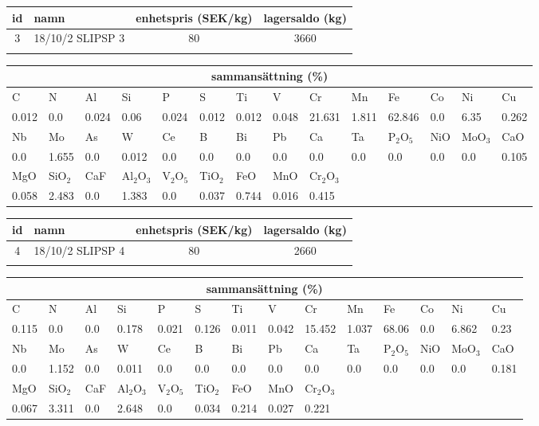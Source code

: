 \begin{center}
{\scriptsize\addtolength{\tabcolsep}{-3pt}
\begin{tabular}{clcc}
id&namn&enhetspris (SEK/kg)&lagersaldo (kg)\\
\hline
3&18/10/2 SLIPSP 3&80&3660\\\\
\end{tabular}
\begin{tabular}{llllllllllllll}
\multicolumn{14}{c}{sammansättning (\%)}\\
\hline
C&N&Al&Si&P&S&Ti&V&Cr&Mn&Fe&Co&Ni&Cu\\
\hline
0.012&0.0&0.024&0.06& 0.024&0.012&0.012&0.048& 21.631&1.811&62.846&0.0& 6.35&0.262\\
\hline
Nb&Mo&As&W&Ce&B&Bi&Pb&Ca&Ta&P$_2$O$_5$&NiO&MoO$_3$&CaO\\
\hline
0.0& 1.655& 0.0& 0.012& 0.0& 0.0& 0.0& 0.0& 0.0& 0.0& 0.0& 0.0& 0.0& 0.105\\
\hline
MgO&SiO$_2$&CaF&Al$_2$O$_3$&V$_2$O$_5$&TiO$_2$&FeO&MnO&Cr$_2$O$_3$\\
\hline
0.058& 2.483& 0.0& 1.383& 0.0& 0.037& 0.744& 0.016& 0.415\\
\end{tabular}
}
\end{center}

\begin{center}
{\scriptsize\addtolength{\tabcolsep}{-3pt}
\begin{tabular}{clcc}
id&namn&enhetspris (SEK/kg)&lagersaldo (kg)\\
\hline
4&18/10/2 SLIPSP 4&80&2660\\\\
\end{tabular}
\begin{tabular}{llllllllllllll}
\multicolumn{14}{c}{sammansättning (\%)}\\
\hline
C&N&Al&Si&P&S&Ti&V&Cr&Mn&Fe&Co&Ni&Cu\\
\hline
0.115&0.0&0.0&0.178& 0.021&0.126&0.011&0.042& 15.452&1.037&68.06&0.0& 6.862&0.23\\
\hline
Nb&Mo&As&W&Ce&B&Bi&Pb&Ca&Ta&P$_2$O$_5$&NiO&MoO$_3$&CaO\\
\hline
0.0& 1.152& 0.0& 0.011& 0.0& 0.0& 0.0& 0.0& 0.0& 0.0& 0.0& 0.0& 0.0& 0.181\\
\hline
MgO&SiO$_2$&CaF&Al$_2$O$_3$&V$_2$O$_5$&TiO$_2$&FeO&MnO&Cr$_2$O$_3$\\
\hline
0.067& 3.311& 0.0& 2.648& 0.0& 0.034& 0.214& 0.027& 0.221\\
\end{tabular}
}
\end{center}

